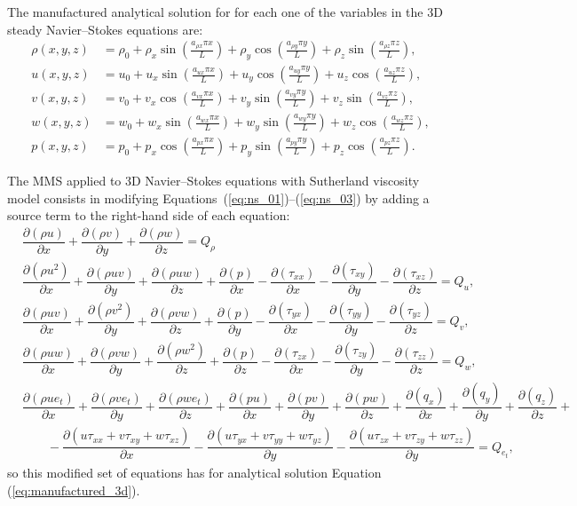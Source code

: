 \documentclass[10pt]{article}
\newcommand{\Diff}[2] {\dfrac{\partial( #1)}{\partial #2}}
\begin{document}
The manufactured analytical solution for for each one of the variables in the 3D steady Navier--Stokes equations are:
\begin{equation}
\begin{split}
\label{eq:manufactured_3d}
\rho\left( x ,y ,z\right) &=  \rho_{0}+ \rho_{x} \sin\left(\frac{a_{ \rho  x} \pi x}{L}\right)+ \rho_{y} \cos\left(\frac{a_{ \rho  y} \pi y}{L}\right) + \rho_{z} \sin\left(\frac{a_{ \rho  z} \pi z}{L}\right) ,\\
u\left( x ,y ,z\right) &= u_{0}+u_{x} \sin\left(\frac{a_{u  x} \pi x}{L}\right)+u_{y} \cos\left(\frac{a_{u  y} \pi y}{L}\right)+u_{z} \cos\left(\frac{a_{u  z} \pi z}{L}\right) ,\\
v\left( x ,y ,z\right) &= v_{0}+v_{x} \cos\left(\frac{a_{v  x} \pi x}{L}\right)+v_{y} \sin\left(\frac{a_{v  y} \pi y}{L}\right)+v_{z} \sin\left(\frac{a_{v  z} \pi z}{L}\right), \\
w\left( x ,y ,z\right) &= w_{0}+w_{x} \sin\left(\frac{a_{w  x} \pi x}{L}\right)+w_{y} \sin\left(\frac{a_{w  y} \pi y}{L}\right)+ w_{z} \cos\left(\frac{a_{w  z} \pi z}{L}\right) ,\\
p\left( x ,y ,z\right) &= p_{0}+p_{x} \cos\left(\frac{a_{p  x} \pi x}{L}\right)+p_{y} \sin\left(\frac{a_{p  y} \pi y}{L}\right)+ p_{z} \cos\left(\frac{a_{p  z} \pi z}{L}\right).
\end{split}
\end{equation}


The MMS applied to 3D Navier--Stokes equations with Sutherland viscosity model  consists in modifying Equations~(\ref{eq:ns_01})--(\ref{eq:ns_03}) by adding a source term to the right-hand side of each equation:
%
\begin{equation}
\begin{split}
\label{eq:ns_3d_mod}
&\Diff{\rho u}{x}+\Diff{\rho v}{y} + \Diff{\rho w}{z} = Q_\rho\\
%
 &\Diff{\rho u^2 }{x}+\Diff{\rho uv}{y} +\Diff{\rho uw}{z} +\Diff{p}{x}-\Diff{\tau_{xx}}{x}-\Diff{\tau_{xy}}{y}-\Diff{\tau_{xz}}{z}= Q_u,\\
%
&\Diff{\rho uv }{x}+\Diff{\rho v^2}{y} +\Diff{\rho vw}{z}+\Diff{p}{y}-\Diff{\tau_{yx}}{x}-\Diff{\tau_{yy}}{y}-\Diff{\tau_{yz}}{z}= Q_v,\\
%
&\Diff{\rho uw }{ x}+\Diff{\rho  vw }{ y}+\Diff{\rho w^2 }{ z}+\Diff{p}{z}-\Diff{\tau_{zx}}{x}-\Diff{\tau_{zy}}{y}-\Diff{\tau_{zz}}{z}=Q_w,\\
%
&\Diff{\rho u e_t}{x}+\Diff{\rho v e_t}{y}+\Diff{\rho we_t}{z}+\Diff{pu}{x}+\Diff{pv}{y}+\Diff{pw}{z} +\Diff{q_x}{x} +\Diff{q_y}{y} +\Diff{q_z}{z}+\\
    &\qquad-\Diff{u\tau_{xx}+v\tau_{xy}+w\tau_{xz}}{x}-\Diff{u\tau_{yx}+v\tau_{yy}+w\tau_{yz}}{y}-\Diff{u\tau_{zx}+v\tau_{zy}+w\tau_{zz}}{y}=Q_{e_t},
\end{split}
\end{equation}
so this modified set of equations has for analytical solution Equation (\ref{eq:manufactured_3d}).
\end{document}
